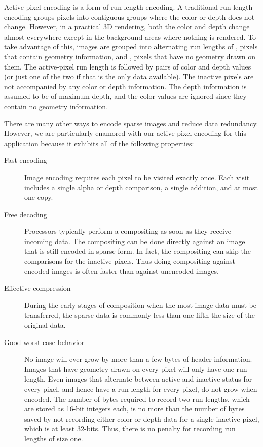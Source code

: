 Active-pixel encoding is a form of run-length encoding.  A traditional
run-length encoding groups pixels into contiguous groups where the color
or depth does not change.  However, in a practical 3D rendering, both
the color and depth change almost everywhere except in the background areas
where nothing is rendered.  To take advantage of this, images are grouped
into alternating run lengths of , pixels that
contain geometry information, and , pixels that
have no geometry drawn on them.  The active-pixel run length is followed by
pairs of color and depth values (or just one of the two if that is the only
data available).  The inactive pixels are not accompanied by any color or
depth information.  The depth information is assumed to be of maximum
depth, and the color values are ignored since they contain no geometry
information.

There are many other ways to encode sparse images and reduce data
redundancy.  However, we are particularly enamored with our active-pixel
encoding for this application because it exhibits all of the following
properties:

\begin{description}
\item[Fast encoding]  Image encoding requires each pixel to be visited
  exactly once.  Each visit includes a single alpha or depth comparison, a
  single addition, and at most one copy.
\item[Free decoding]  Processors typically perform a compositing as
  soon as they receive incoming data.  The compositing can be done
  directly against an image that is still encoded in sparse form.  In fact,
  the compositing can skip the comparisons for the inactive pixels.
  Thus doing compositing against encoded images is often faster than
  against unencoded images.
\item[Effective compression]  During the early stages of composition when
  the most image data must be transferred, the sparse data is commonly less
  than one fifth the size of the original data.
\item[Good worst case behavior] No image will ever grow by more than a few
  bytes of header information.  Images that have geometry drawn on every
  pixel will only have one run length.  Even images that alternate between
  active and inactive status for every pixel, and hence have a run length
  for every pixel, do not grow when encoded.  The number of bytes required
  to record two run lengths, which are stored as 16-bit integers each, is
  no more than the number of bytes saved by not recording either color or
  depth data for a single inactive pixel, which is at least 32-bits.  Thus,
  there is no penalty for recording run lengths of size one.
\end{description}

